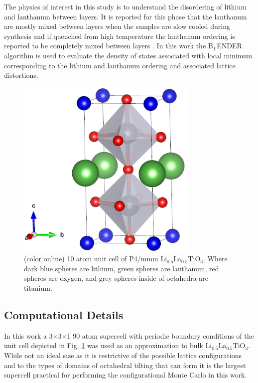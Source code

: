 \documentclass[aps,pre,reprint,superscriptaddress,showkeys]{revtex4-1}
\begin{document}
The physics of interest in this study is to understand the disordering of lithium and lanthanum between layers.  It is reported for this phase that the lanthanum are mostly mixed between layers when the samples are slow cooled during synthesis and if quenched from high temperature the lanthanum ordering is reported to be completely mixed between layers \cite{P4mmmstrucuture}. In this work the B$_L$ENDER algorithm is used to evaluate the density of states associated with local minimum corresponding to  the lithium and lanthanum ordering and associated lattice distortions.   
\begin{figure}[h!]
\includegraphics[width=8.6cm]{fig6.eps}
\caption{(color online) 10 atom unit cell of P4/mmm Li$_{0.5}$La$_{0.5}$TiO$_{3}$. Where dark blue spheres are lithium, green spheres are lanthanum, red spheres are oxygen, and grey spheres inside of octahedra are titanium.\label{LLTO_unit_cell}}
\end{figure}
\subsection{Computational Details}
In this work a 3$\times$3$\times$1 90 atom supercell with periodic boundary conditions of the unit cell depicted in Fig. \ref{LLTO_unit_cell} was used as an approximation to bulk Li$_{0.5}$La$_{0.5}$TiO$_{3}$. While not an ideal size as it is  restrictive of the possible lattice configurations and to the types of domains of octahedral tilting that can form it is the largest supercell practical for performing the configurational Monte Carlo in this work. 
\end{document}
